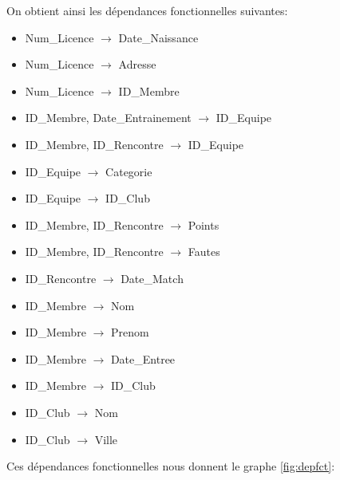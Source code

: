 \documentclass[a4paper»,8pt,french,fleqn]{report}
\begin{document}
On obtient ainsi les dépendances fonctionnelles suivantes: \\

\begin{itemize}

\item Num\_Licence $\rightarrow$ Date\_Naissance
\item Num\_Licence $\rightarrow$ Adresse
\item Num\_Licence $\rightarrow$ ID\_Membre
\item ID\_Membre, Date\_Entrainement $\rightarrow$ ID\_Equipe
\item ID\_Membre, ID\_Rencontre $\rightarrow$ ID\_Equipe
\item ID\_Equipe $\rightarrow$ Categorie
\item ID\_Equipe $\rightarrow$ ID\_Club
\item ID\_Membre, ID\_Rencontre $\rightarrow$ Points
\item ID\_Membre, ID\_Rencontre $\rightarrow$ Fautes
\item ID\_Rencontre $\rightarrow$ Date\_Match
\item ID\_Membre $\rightarrow$ Nom
\item ID\_Membre $\rightarrow$ Prenom
\item ID\_Membre $\rightarrow$ Date\_Entree
\item ID\_Membre $\rightarrow$ ID\_Club
\item ID\_Club $\rightarrow$ Nom
\item ID\_Club $\rightarrow$ Ville

\end{itemize}

Ces dépendances fonctionnelles nous donnent le graphe \ref{fig:depfct}:
\end{document}
